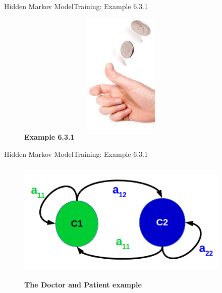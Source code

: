 \documentclass[10pt]{beamer}
\begin{document}
\begin{frame}{Hidden Markov Model}{Training: Example 6.3.1}
  \begin{figure}[h]
    \centering
    \includegraphics[width=4in,height=2.3in]{figures/coin_toss.jpg}
    \caption {\textbf{Example 6.3.1}}
  \end{figure}
\end{frame}

\begin{frame}{Hidden Markov Model}{Training: Example 6.3.1}
  \begin{figure}[h]
    \centering
    \includegraphics[width=4in,height=2.3in]{figures/toss_coin_example_01.png}
    \caption {\textbf{The Doctor and Patient example}}
  \end{figure}
\end{frame}
\end{document}
